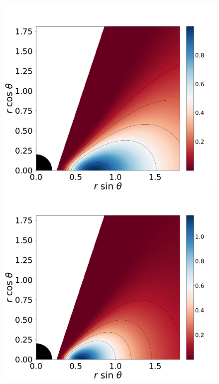 \documentclass[twocolumn,aps,showpacs,showkeys,prd,superscriptaddress,byrevtex, amsmath]{revtex4-1}
\begin{document}
\begin{figure}
\centering
\includegraphics[scale=0.14]{figures/fig1_I_10.pdf}
\hspace{-0.3cm}
\includegraphics[scale=0.14]{figures/fig1_I_1.pdf}
\hspace{-0.2cm}

\end{figure}
\end{document}
